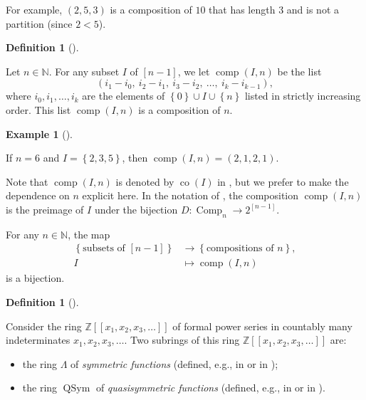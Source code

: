 \documentclass[numbers=enddot,12pt,final,onecolumn,notitlepage]{scrartcl}%
\numberwithin{exer}{section}
\theoremstyle{definition}
\newtheorem{defi}[theo]{Definition}
\newenvironment{definition}[1][]
{\begin{defi}[#1]\begin{leftbar}}
{\end{leftbar}\end{defi}}
\newtheorem{exam}[theo]{Example}
\newenvironment{example}[1][]
{\begin{exam}[#1]\begin{leftbar}}
{\end{leftbar}\end{exam}}
\begin{document}
For example, $\left(  2,5,3\right)  $ is a composition of $10$ that has length
$3$ and is not a partition (since $2<5$).

\begin{definition}
Let $n\in\mathbb{N}$. For any subset $I$ of $\left[  n-1\right]  $, we let
$\operatorname*{comp}\left(  I,n\right)  $ be the list%
\[
\left(  i_{1}-i_{0},\ i_{2}-i_{1},\ i_{3}-i_{2},\ \ldots,\ i_{k}%
-i_{k-1}\right)  ,
\]
where $i_{0},i_{1},\ldots,i_{k}$ are the elements of $\left\{  0\right\}  \cup
I\cup\left\{  n\right\}  $ listed in strictly increasing order. This list
$\operatorname*{comp}\left(  I,n\right)  $ is a composition of $n$.
\end{definition}

\begin{example}
If $n=6$ and $I=\left\{  2,3,5\right\}  $, then $\operatorname*{comp}\left(
I,n\right)  =\left(  2,1,2,1\right)  $.
\end{example}

Note that $\operatorname*{comp}\left(  I,n\right)  $ is denoted by
$\operatorname*{co}\left(  I\right)  $ in \cite[\S 7.19]{EC2}, but we prefer
to make the dependence on $n$ explicit here. In the notation of
\cite[Definition 5.1.10]{GriRei}, the composition $\operatorname*{comp}\left(
I,n\right)  $ is the preimage of $I$ under the bijection
$D:\operatorname*{Comp}\nolimits_{n}\rightarrow2^{\left[  n-1\right]  }$.

For any $n\in\mathbb{N}$, the map
\begin{align*}
\left\{  \text{subsets of }\left[  n-1\right]  \right\}   &  \rightarrow
\left\{  \text{compositions of }n\right\}  ,\\
I  &  \mapsto\operatorname*{comp}\left(  I,n\right)
\end{align*}
is a bijection.

\begin{definition}
Consider the ring $\mathbb{Z}\left[  \left[  x_{1},x_{2},x_{3},\ldots\right]
\right]  $ of formal power series in countably many indeterminates
$x_{1},x_{2},x_{3},\ldots$. Two subrings of this ring $\mathbb{Z}\left[
\left[  x_{1},x_{2},x_{3},\ldots\right]  \right]  $ are:

\begin{itemize}
\item the ring $\Lambda$ of \emph{symmetric functions} (defined, e.g., in
\cite[\S 7.1]{EC2} or in \cite[\S 2.1]{GriRei});

\item the ring $\operatorname*{QSym}$ of \emph{quasisymmetric functions}
(defined, e.g., in \cite[\S 7.19]{EC2} or in \cite[\S 5.1]{GriRei}).
\end{itemize}
\end{definition}
\end{document}
